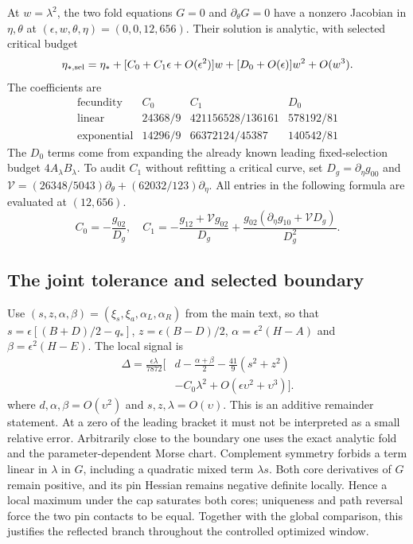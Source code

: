 \documentclass[aps,pre,reprint,amsmath,amssymb,longbibliography]{revtex4-2}
\begin{document}
At $w=\lambda^2$, the two fold equations $G=0$ and
$\partial_\theta G=0$ have a nonzero Jacobian in $\eta,\theta$ at
$(\epsilon,w,\theta,\eta)=(0,0,12,656)$. Their solution is analytic,
with selected critical budget
\begin{equation}
 \eta_{*,\rm sel}=\eta_*+
       [C_0+C_1\epsilon+O(\epsilon^2)]w
       +[D_0+O(\epsilon)]w^2+O(w^3).
 \label{eq:v3-joint-selected-critical}
\end{equation}
The coefficients are
\begin{equation}
 \begin{array}{c|ccc}
 \text{fecundity}&C_0&C_1&D_0\\\hline
 \text{linear}&24368/9&421156528/136161&578192/81\\
 \text{exponential}&14296/9&66372124/45387&140542/81
 \end{array}
 \label{eq:v3-joint-selected-critical-coefficients}
\end{equation}
The $D_0$ terms come from expanding the already known leading
fixed-selection budget $4A_\lambda B_\lambda$. To audit $C_1$
without refitting a critical curve, set
$D_g=\partial_\eta g_{00}$ and
$\mathcal V=(26348/5043)\partial_\theta+(62032/123)\partial_\eta$.
All entries in the following formula are evaluated at $(12,656)$. 
\begin{equation}
 C_0=-\frac{g_{02}}{D_g},\quad
 C_1=-\frac{g_{12}+\mathcal Vg_{02}}{D_g}
 +\frac{g_{02}(\partial_\eta g_{10}+\mathcal VD_g)}{D_g^2}.
 \label{eq:v3-joint-mixed-coefficient-extraction}
\end{equation}

\subsection{The joint tolerance and selected boundary}
\label{par:v3-joint-joint-tolerance}
Use $(s,z,\alpha,\beta)=(\xi_s,\xi_a,\alpha_L,\alpha_R)$
from the main text, so that
$s=\epsilon[(B+D)/2-q_*]$, $z=\epsilon(B-D)/2$,
$\alpha=\epsilon^2(H-A)$ and $\beta=\epsilon^2(H-E)$.
The local signal is
\begin{equation}
 \begin{aligned}
 \Delta=\frac{\epsilon\lambda}{7872}
 \biggl[&d-\frac{\alpha+\beta}{2}-\frac{41}{9}(s^2+z^2)\\
 &-C_0\lambda^2+O(\epsilon\upsilon^2+\upsilon^3)\biggr].
 \end{aligned}
 \label{eq:v3-joint-full-selected-normal-form}
\end{equation}
where $d,\alpha,\beta=O(\upsilon^2)$ and $s,z,\lambda=O(\upsilon)$.
This is an additive remainder statement. At a zero of the leading
bracket it must not be interpreted as a small relative error.
Arbitrarily close to the boundary one uses the exact analytic fold
and the parameter-dependent Morse chart. Complement symmetry forbids
a term linear in $\lambda$ in $G$, including a quadratic mixed
term $\lambda s$. Both core derivatives of $G$ remain positive,
and its pin Hessian remains negative definite locally. Hence a local
maximum under the cap saturates both cores; uniqueness and path
reversal force the two pin contacts to be equal. Together with the global comparison, this justifies the reflected
branch throughout the controlled optimized window.
\end{document}
